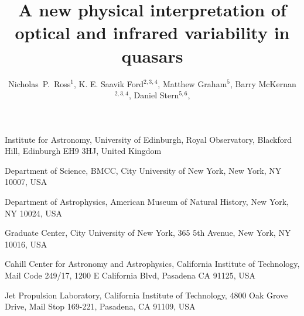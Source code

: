 \documentclass{nature}
\title{A new physical interpretation of optical and infrared variability in quasars}
\author{Nicholas~P.~Ross$^{1}$,    
K. E. Saavik Ford$^{2,3,4}$,  
Matthew Graham$^{5}$,  
Barry McKernan$^{2,3,4}$,  
Daniel Stern$^{5,6}$, 
}
\begin{document}
\maketitle

\begin{affiliations}
  \item Institute for Astronomy, University of Edinburgh, Royal Observatory, Blackford Hill, Edinburgh EH9 3HJ, United Kingdom 
  \item Department of Science, BMCC, City University of New York, New York, NY 10007, USA
 \item Department of Astrophysics, American Museum of Natural History, New York, NY 10024, USA
 \item  Graduate Center, City University of New York, 365 5th Avenue, New York, NY 10016, USA
\item Cahill Center for Astronomy and Astrophysics, California Institute of Technology, Mail Code 249/17, 1200 E California Blvd, Pasadena CA 91125, USA
  \item Jet Propulsion Laboratory, California Institute of Technology, 4800 Oak Grove Drive, Mail Stop 169-221, Pasadena, CA 91109, USA 
\end{affiliations}
\end{document}
